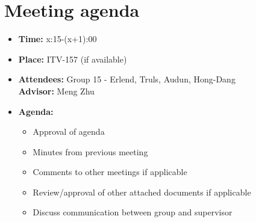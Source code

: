 \documentclass[12pt, a4paper]{article}
\begin{document}
\section{Meeting agenda}
\begin{itemize}
\item \textbf{Time:} x:15-(x+1):00
\item \textbf{Place:} ITV-157 (if available)\\
\item \textbf{Attendees:} Group 15 - Erlend, Truls, Audun, Hong-Dang \\ \textbf{Advisor:} Meng Zhu
\item \textbf{Agenda:}
	\begin{itemize}
		\item Approval of agenda
		\item Minutes from previous meeting
		\item Comments to other meetings if applicable
		\item Review/approval of other attached documents if applicable
		\item Discuss communication between group and supervisor
		\end{itemize}
\end{itemize}
\end{document}
